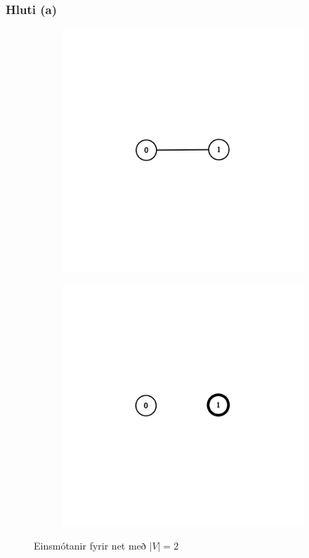 \documentclass[12pt, a4paper, hidelinks]{article}
\begin{document}
\subsubsection*{Hluti (a)}
\begin{figure}[H]
    \centering
    \begin{subfigure}[b]{0.45\textwidth}
        \includegraphics[width=\textwidth]{graph_v2_1.png}
    \end{subfigure}
    \begin{subfigure}[b]{0.45\textwidth}
        \includegraphics[width=\textwidth]{graph_v2_2.png}
    \end{subfigure}
    \caption{Einsmótanir fyrir net með $|V| = 2$}
    \label{fig:my_label}
\end{figure}
\end{document}
